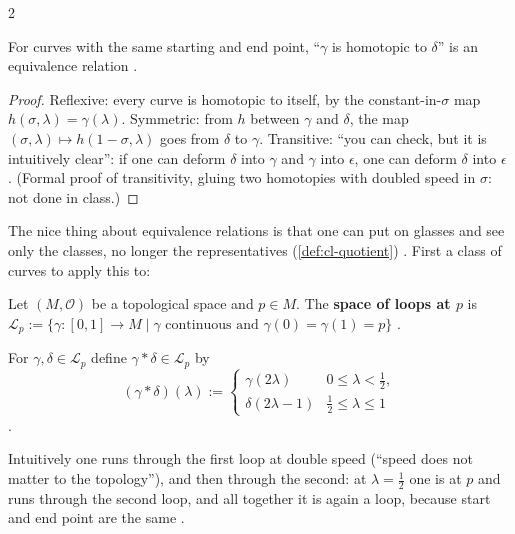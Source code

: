 \begin{paracol}{2}
\begin{proposition}\label{prop:iv-homotopy-equiv}
For curves with the same starting and end point, ``$\gamma$ is homotopic to $\delta$'' is an equivalence relation .
\end{proposition}
\begin{proof}
Reflexive: every curve is homotopic to itself, by the constant-in-$\sigma$ map $h(\sigma,\lambda)=\gamma(\lambda)$. Symmetric: from $h$ between $\gamma$ and $\delta$, the map $(\sigma,\lambda)\mapsto h(1-\sigma,\lambda)$ goes from
$\delta$ to $\gamma$. Transitive: ``you can check, but it is intuitively clear'': if one can deform $\delta$ into $\gamma$ and $\gamma$ into $\epsilon$, one can deform $\delta$ into $\epsilon$
. (Formal proof of transitivity, gluing two homotopies with doubled speed in $\sigma$: not done in class.)
\end{proof}
The nice thing about equivalence relations is that one can put on glasses and see only the classes, no longer the representatives (\cref{def:cl-quotient}) . First a class of curves to apply this to:

\begin{definition}\label{def:iv-loops}
Let $(M,\mathcal O)$ be a topological space and $p\in M$. The \textbf{space of loops at $p$} is
$\mathcal L_p:=\{\gamma\colon[0,1]\to M\mid \gamma\text{ continuous and }\gamma(0)=\gamma(1)=p\}$ .
\end{definition}

\begin{definition}\label{def:iv-concat}
For $\gamma,\delta\in\mathcal L_p$ define $\gamma*\delta\in\mathcal L_p$ by
\[
  (\gamma*\delta)(\lambda):=\begin{cases}\gamma(2\lambda)&0\le\lambda<\tfrac12,\\ \delta(2\lambda-1)&\tfrac12\le\lambda\le1\end{cases}
\]
.
\end{definition}
Intuitively one runs through the first loop at double speed (``speed does not matter to the topology''), and then through the second: at $\lambda=\frac12$ one is at $p$ and runs through the second loop, and all together it is
again a loop, because start and end point are the same .


\end{paracol}
